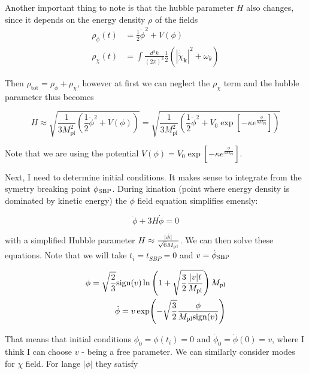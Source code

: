 Another important thing to note is that the hubble parameter $H$ also changes, since it depends on the energy density $\rho$ of the fields
\begin{align*}
    \rho_{\phi} (t) &= \frac{1}{2} \dot{ \phi }^2 + V( \phi ) \\
    \rho_{\chi} (t) &= \int \frac{d^3 k}{(2 \pi)^3} \frac{1}{2} (|\dot{\tilde{\chi}}_{\textbf{k}}|^2 + \omega_{k})
\end{align*}

Then $\rho_{\text{tot}} = \rho_{\phi} + \rho_{\chi}$, however at first we can neglect the $\rho_{\chi}$ term and the hubble parameter thus becomes

\begin{equation*}
    H \approx \sqrt{\frac{1} {3 M_{\text{pl}}^2} \left( \frac{1}{2} \dot{ \phi }^2 + V( \phi ) \right)} = \sqrt{\frac{1} {3 M_{\text{pl}}^2} \left( \frac{1}{2} \dot{ \phi }^2 + V_0 \exp \left[ - \kappa e^{\frac{\phi}{b M_{\text{Pl}}}} \right] \right)}
\end{equation*}

Note that we are using the potential $V(\phi) = V_0 \exp \left[ - \kappa e^{\frac{\phi}{b M_{\text{Pl}}}} \right]$.

Next, I need to determine initial conditions. It makes sense to integrate from the symetry breaking point $\phi_{\rm SBP}$. During kination (point where energy density is dominated by kinetic energy) the $\phi$ field equation simplifies emensly:

\begin{equation*}
    \ddot{\phi} + 3 H \dot{\phi} = 0
\end{equation*}

with a simplified Hubble parameter $ H \approx \frac{|\dot{\phi}|}{\sqrt{6} M_{\rm pl}} $. We can then solve these equations. Note that we will take $t_i = t_{SBP} = 0$ and $v=\dot{\phi}_{\rm SBP}$

\begin{align*}
    \phi = \sqrt{ \frac{2}{3}} \text{sign}(v) \ln \left( 1+\sqrt{\frac{3}{2}\frac{|v| t} {M_{\rm pl}}} \right) M_{\rm pl} \\
    \dot{ \phi } = v \exp( - \sqrt{\frac{3}{2}} \frac{\phi}{M_{\rm pl} \text{sign}(v)})
\end{align*}

That means that initial conditions $\phi_0 = \phi(t_i) = 0$ and $\dot{\phi}_{0} = \dot{\phi}(0) = v$, where I think I can choose $v$ - being a free parameter. We can similarly consider modes for $\chi$ field. For lange $|\phi|$ they satisfy

